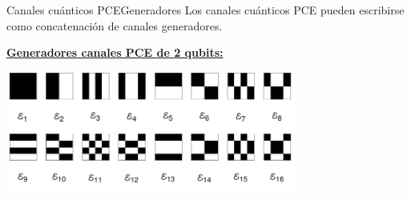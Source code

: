 \documentclass[xcolor=dvipsnames,presentation]{beamer}%
\begin{document}
\begin{frame}{Canales cuánticos PCE}{Generadores}
Los canales cuánticos PCE pueden escribirse como concatenación 
de canales generadores.

\vfill
\small{\textbf{\underline{Generadores canales PCE de 2 qubits:}}}

\begin{center}
\includegraphics[height=4cm]{images/2qubits-generators}
\end{center}

\end{frame}
\end{document}
